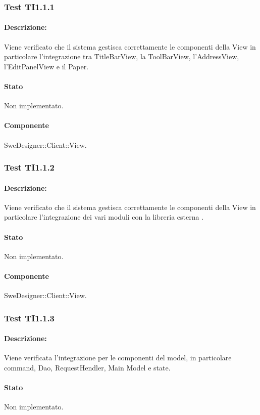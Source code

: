 \documentclass[../PianoDiQualifica.tex]{subfiles}
\begin{document}
	\subsubsection{Test TI1.1.1}
	\paragraph{Descrizione:} Viene verificato che il sistema gestisca correttamente le componenti della View in particolare l'integrazione tra TitleBarView, la ToolBarView, l'AddressView, l'EditPanelView e il Paper.
	\paragraph{Stato} Non implementato.
	\paragraph{Componente} SweDesigner::Client::View.
		
	\subsubsection{Test TI1.1.2}
	\paragraph{Descrizione:} Viene verificato che il sistema gestisca correttamente le componenti della View in particolare l'integrazione dei vari moduli con la libreria esterna  . %
	\paragraph{Stato} Non implementato.
	\paragraph{Componente} SweDesigner::Client::View.
	
	\subsubsection{Test TI1.1.3}
	\paragraph{Descrizione:} Viene verificata l'integrazione per le componenti del model, in particolare command, Dao, RequestHendler, Main Model e state.
	\paragraph{Stato} Non implementato.
\end{document}
